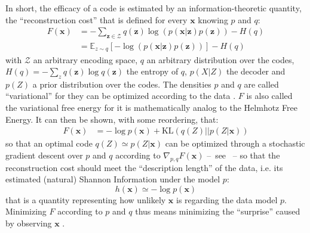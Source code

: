 \documentclass[12pt,twoside,openright]{article}
\begin{document}
In short, the efficacy of a code is estimated by an information-theoretic quantity, the ``reconstruction cost'' that is defined for every $\boldsymbol{x}$ knowing $p$ and $q$:
\begin{align}
F(\boldsymbol{x}) &= - \sum_{\boldsymbol{z} \in \mathcal{Z}} q(\boldsymbol{z}) \log (p(\boldsymbol{x}|\boldsymbol{z})p(\boldsymbol{z})) - H(q)\nonumber\\
&= \mathbb{E}_{z\sim q} \left[-\log (p(\boldsymbol{x}|\boldsymbol{z})p(\boldsymbol{z}))\right] - H(q)
\label{eq:FEP-energy}
\end{align}
with $\mathcal{Z}$ an arbitrary encoding space, $q$ an arbitrary distribution over the codes, $H(q) = -\sum_z q(\boldsymbol{z}) \log q(\boldsymbol{z})$ the entropy of $q$, $p(X|Z)$ the decoder and $p(Z)$ a prior distribution over the codes.
The densities $p$ and $q$ are called ``variational'' for they can be optimized according to the data \cite{hinton2006fast,kingma2013auto}.  
$F$ is also called the variational free energy for it is mathematically analog to the Helmhotz Free Energy.
It can then be shown, with some reordering, that:
\begin{align}
F(\boldsymbol{x}) 
&= - \log p(\boldsymbol{x}) + \text{KL}(q(Z)||p(Z|\boldsymbol{x}))
\label{eq:FEP}
\end{align}
so that an optimal code $q(Z)\simeq p(Z|\boldsymbol{x})$ can be optimized through a stochastic gradient descent over $p$ and $q$ according to $\nabla_{p,q} F(\boldsymbol{x}) $	 --~see \cite{kingma2013auto}~-- so that the reconstruction cost should meet the ``description length'' of the data, i.e. its estimated (natural) Shannon Information under the model $p$:
$$h(\boldsymbol{x}) \simeq -\log p(\boldsymbol{x}) %
$$
that is a quantity representing how unlikely $\boldsymbol{x}$ is regarding the data model $p$. Minimizing $F$ according to $p$ and $q$ thus means minimizing the ``surprise'' caused by observing $\boldsymbol{x}$ \cite{friston2010free}.
 
 
 
\end{document}
